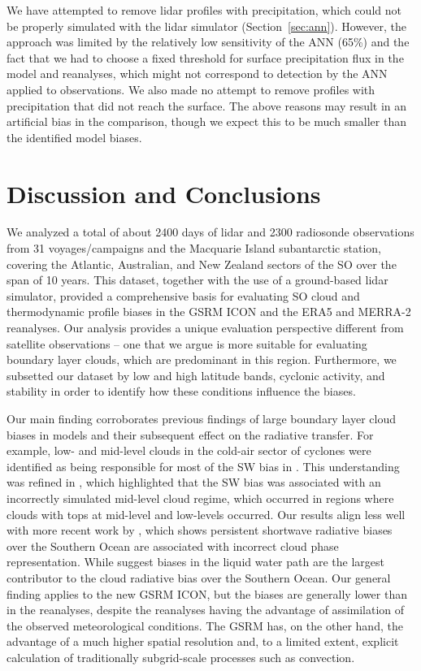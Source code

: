 \documentclass[draft]{agujournal2019}
\begin{document}
We have attempted to remove lidar profiles with precipitation, which could not be properly simulated with the lidar simulator (Section~\ref{sec:ann}). However, the approach was limited by the relatively low sensitivity of the ANN (65\%) and the fact that we had to choose a fixed threshold for surface precipitation flux in the model and reanalyses, which might not correspond to detection by the ANN applied to observations. We also made no attempt to remove profiles with precipitation that did not reach the surface. The above reasons may result in an artificial bias in the comparison, though we expect this to be much smaller than the identified model biases.

\section{Discussion and Conclusions}

We analyzed a total of about 2400 days of lidar and 2300 radiosonde observations from 31 voyages/campaigns and the Macquarie Island subantarctic station, covering the Atlantic, Australian, and New Zealand sectors of the SO over the span of 10 years. This dataset, together with the use of a ground-based lidar simulator, provided a comprehensive basis for evaluating SO cloud and thermodynamic profile biases in the GSRM ICON and the ERA5 and MERRA-2 reanalyses. Our analysis provides a unique evaluation perspective different from satellite observations -- one that we argue is more suitable for evaluating boundary layer clouds, which are predominant in this region. Furthermore, we subsetted our dataset by low and high latitude bands, cyclonic activity, and stability in order to identify how these conditions influence the biases.

Our main finding corroborates previous findings of large boundary layer cloud biases in models and their subsequent effect on the radiative transfer. For example, low- and mid-level clouds in the cold-air sector of cyclones were identified as being responsible for most of the SW bias in . This understanding was refined in , which highlighted that the SW bias was associated with an incorrectly simulated mid-level cloud regime, which occurred in regions where clouds with tops at mid-level and low-levels occurred. Our results align less well with more recent work by , which shows persistent shortwave radiative biases over the Southern Ocean are associated with incorrect cloud phase representation. While  suggest biases in the liquid water path are the largest contributor to the cloud radiative bias over the Southern Ocean. Our general finding applies to the new GSRM ICON, but the biases are generally lower than in the reanalyses, despite the reanalyses having the advantage of assimilation of the observed meteorological conditions. The GSRM has, on the other hand, the advantage of a much higher spatial resolution and, to a limited extent, explicit calculation of traditionally subgrid-scale processes such as convection.
\end{document}
